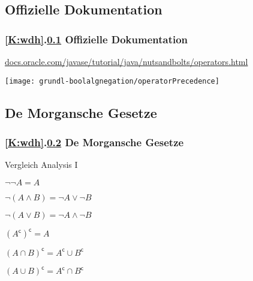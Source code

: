 \documentclass[9pt,german]{beamer}%
\begin{document}
\def\stitle{Offizielle Dokumentation}
\subsection{\stitle}\label{S:Dokumentation}
\begin{frame}[fragile]%
  \frametitle{\ref{K:wdh}.\ref{S:Dokumentation} \stitle}%
\url{docs.oracle.com/javase/tutorial/java/nutsandbolts/operators.html}

\begin{center}
\texttt{[image: grundl-boolalgnegation/operatorPrecedence]}
\end{center}
\end{frame}


\def\stitle{De Morgansche Gesetze}
\subsection{\stitle}\label{S:Morgansche}
\begin{frame}[fragile]%
  \frametitle{\ref{K:wdh}.\ref{S:Morgansche} \stitle}%
Vergleich Analysis I
\medskip

\begin{description}
  \item[und bzw. oder]
  \item $\neg \neg A = A$
  \item $\neg (A \wedge B) = \neg A \vee \neg B$
  \item $\neg (A \vee B) = \neg A \wedge \neg B$
\end{description}
\medskip

\begin{description}
  \item[Schnittmenge bzw. Vereinigung]
  \item $(A^{\mathsf{c}})^{\mathsf{c}} = A$
  \item $(A \cap B)^{\mathsf{c}} = A^{\mathsf{c}} \cup B^{\mathsf{c}}$
  \item $(A \cup B)^{\mathsf{c}} = A^{\mathsf{c}} \cap B^{\mathsf{c}}$
\end{description}

\end{frame}
\end{document}
